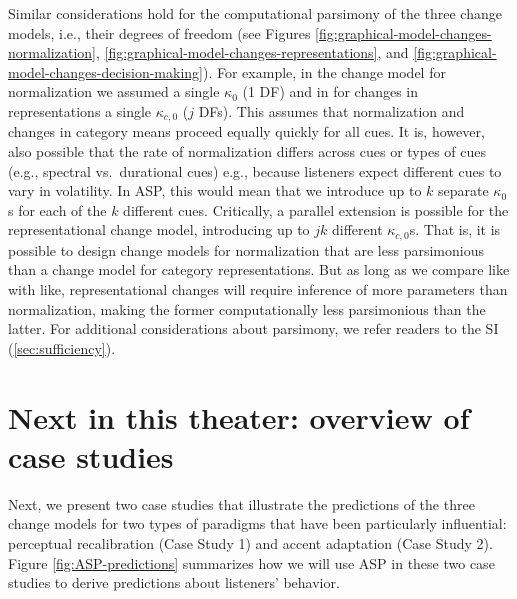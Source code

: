 \documentclass[
  11pt,
  man,floatsintext]{apa6}
\begin{document}
Similar considerations hold for the computational parsimony of the three change models, i.e., their degrees of freedom (see Figures \ref{fig:graphical-model-changes-normalization}, \ref{fig:graphical-model-changes-representations}, and \ref{fig:graphical-model-changes-decision-making}). For example, in the change model for normalization we assumed a single \(\kappa_0\) (1 DF) and in for changes in representations a single \(\kappa_{c,0}\) (\(j\) DFs). This assumes that normalization and changes in category means proceed equally quickly for all cues. It is, however, also possible that the rate of normalization differs across cues or types of cues (e.g., spectral vs.~durational cues) e.g., because listeners expect different cues to vary in volatility. In ASP, this would mean that we introduce up to \(k\) separate \(\kappa_{0}\)s for each of the \(k\) different cues. Critically, a parallel extension is possible for the representational change model, introducing up to \(jk\) different \(\kappa_{c,0}\)s. That is, it is possible to design change models for normalization that are less parsimonious than a change model for category representations. But as long as we compare like with like, representational changes will require inference of more parameters than normalization, making the former computationally less parsimonious than the latter.
For additional considerations about parsimony, we refer readers to the SI (\ref{sec:sufficiency}).

\section{Next in this theater: overview of case studies}\label{next-in-this-theater-overview-of-case-studies}

Next, we present two case studies that illustrate the predictions of the three change models for two types of paradigms that have been particularly influential: perceptual recalibration (Case Study 1) and accent adaptation (Case Study 2). Figure \ref{fig:ASP-predictions} summarizes how we will use ASP in these two case studies to derive predictions about listeners' behavior.
\end{document}
